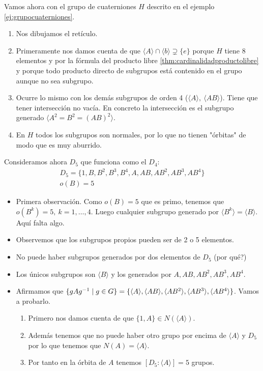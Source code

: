 \begin{ej}
	Vamos ahora con el grupo de cuaterniones $H$ descrito en el ejemplo \ref{ej:grupocuaterniones}.
	
	\begin{enumerate}
		\item Nos dibujamos el retículo.
		\item Primeramente nos damos cuenta de que $\langle A \rangle \cap \langle b \rangle \supsetneq \{e\}$ porque $H$ tiene 8 elementos y por la fórmula del producto libre \ref{thm:cardinalidadproductolibre} y porque todo producto directo de subgrupos está contenido en el grupo aunque no sea subgrupo.
		\item Ocurre lo mismo con los demás subgrupos de orden 4 ($\langle A \rangle,\ \langle AB \rangle$). Tiene que tener intersección no vacía. En concreto la intersección es el subgrupo generado $\langle A^2 = B^2 = (AB)^2 \rangle$.
		\item En $H$ todos los subgrupos son normales, por lo que no tienen "órbitas" de modo que es muy aburrido.
	\end{enumerate}
\end{ej}

\begin{ej}
	Consideramos ahora $D_5$ que funciona como el $D_4$:
	\begin{align*}
	D_5 = \{1, B, B^2, B^3, B^4, A, AB, AB^2, AB^3, AB^4\} \\
	o(B) = 5
	\end{align*}
	\begin{itemize}
		\item Primera observación. Como $o(B) = 5$ que es primo, tenemos que $o(B^k) = 5,\ k = 1, \dots, 4$. Luego cualquier subgrupo generado por $\langle B^k \rangle = \langle B \rangle$. Aquí falta algo.
		\item Observemos que los subgrupos propios pueden ser de 2 o 5 elementos.
		\item No puede haber subgrupos generados por dos elementos de $D_5$ (por qué?)
		\item Los únicos subgrupos son $\langle B \rangle$ y los generados por $A, AB, AB^2, AB^3, AB^4$.
		\item Afirmamos que $\{gAg^{-1} \mid g \in G\} = \{\langle A \rangle, \langle AB \rangle, \langle AB^2 \rangle, \langle AB^3 \rangle, \langle AB^4 \rangle \}$. Vamos a probarlo.
		
		\begin{enumerate}
			\item Primero nos damos cuenta de que $\{1, A\} \in N(\langle A \rangle)$.
			\item Además tenemos que no puede haber otro grupo por encima de $\langle A \rangle$ y $D_5$ por lo que tenemos que $N(A) = \langle A \rangle$.
			\item Por tanto en la órbita de $A$ tenemos $[D_5:\langle A \rangle] = 5$ grupos.
		\end{enumerate}
		
	\end{itemize}
\end{ej}

